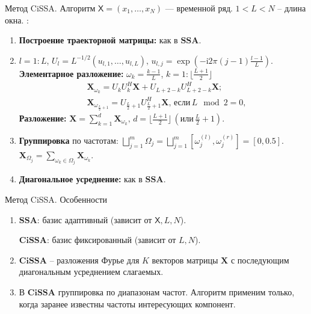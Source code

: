 \documentclass[notheorems, handout]{beamer}
\newcommand{\SSA}{\textbf{SSA}}
\newcommand{\CISSA}{\textbf{CiSSA}}
\newcommand{\TS}{\mathsf{X}}
\begin{document}
\begin{frame}{Метод CiSSA. Алгоритм}
	\( \TS = (x_1, \ldots, x_N) \) — временной ряд.  \( 1 < L < N \) --  длина окна.
	\textbf{\structure{Алгоритм $\CISSA$}}:
	\begin{enumerate}
		\item \textbf{Построение траекторной матрицы:} как в $\SSA$.

		\item $l = 1:L$, ${U}_{l}=L^{-1/2}(u_{l,1},\dots,u_{l,L}), \, u_{l,j}=\exp\left(-\mathrm{i}2\pi(j-1)\frac{l-1}{L}\right).$
		      \textbf{Элементарное разложение:} $\omega_k = \frac{k-1}{L}$, $k = 1:\lfloor \frac{L+1}{2} \rfloor$
		      \begin{align*}
			       & \mathbf X_{\omega_k}  = U_k U_k^H \mathbf X + U_{L+2-k} U_{L+2-k}^H \mathbf X; \\
			       & \mathbf X_{\omega_{\frac{L}{2} + 1}}  =
			      U_{\frac{L}{2} + 1} U_{\frac{L}{2} + 1}^H \mathbf X, \, \text{если} \, L \mod 2 = 0,
		      \end{align*}
		      \textbf{Разложение:}
		      $
			      \mathbf{X} = \sum\limits_{k=1}^d \mathbf{X}_{\omega_k}, \, d = \lfloor \frac{L+1}{2} \rfloor \, (\text{или} \, \frac{L}{2} + 1).
		      $

		\item \textbf{Группировка} по частотам:
		      $\bigsqcup \limits_{j=1}^m \Omega_j =
			      \bigsqcup \limits_{j=1}^m
			      \left[ \omega_j^{(l)}, \omega_j^{(r)} \right] =
			      [0, 0.5]$. $\mathbf X_{\Omega_j} =\sum\limits_{\omega_k \in \Omega_j} \mathbf{X}_{\omega_k}$.

		\item \textbf{Диагональное усреднение:} как в $\SSA$.
	\end{enumerate}

\end{frame}

\begin{frame}{Метод CiSSA. Особенности}
	\bigskip
	\begin{enumerate}
		\item $\SSA$: базис адаптивный (зависит от $\TS, L, N$).

		      $\CISSA$: базис фиксированный (зависит от $L, N$).
		      \bigskip
		\item
		      $\CISSA$ -- разложения Фурье для $K$ векторов матрицы $\mathbf X$ с последующим диагональным усреднением слагаемых.
		      \bigskip
		\item В $\CISSA$ группировка по диапазонам частот. Алгоритм применим только, когда заранее известны частоты интересующих компонент.

	\end{enumerate}
\end{frame}
\end{document}
